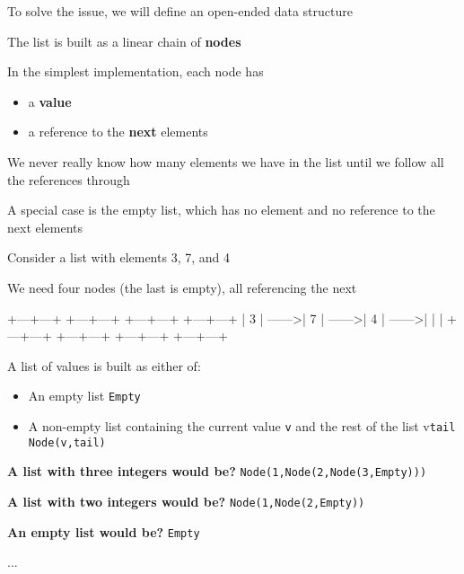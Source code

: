 \documentclass{beamer}
\begin{document}
\begin{slide}{
\item To solve the issue, we will define an open-ended data structure
\item The list is built as a linear chain of \textbf{nodes}
\item In the simplest implementation, each node has
\begin{itemize}
\item a \textbf{value}
\item a reference to the \textbf{next} elements
\end{itemize}
\item We never really know how many elements we have in the list until we follow all the references through
\item A special case is the empty list, which has no element and no reference to the next elements
}\end{slide}

\begin{frame}[fragile]
\begin{codewithblock}{\item Consider a list with elements 3, 7, and 4 \item We need four nodes (the last is empty), all referencing the next}
+---+---+    +---+---+    +---+---+    +---+---+
| 3 | ------>| 7 | ------>| 4 | ------>|   |   |
+---+---+    +---+---+    +---+---+    +---+---+
\end{codewithblock}
\end{frame}

\begin{slide}{
\item A list of values is built as either of:
\begin{itemize}
\item An empty list \texttt{Empty}
\item A non-empty list containing the current value \texttt{v} and the rest of the list v\texttt{tail} \texttt{Node(v,tail)}
\end{itemize}
\item \textbf{A list with three integers would be?} \pause \texttt{Node(1,Node(2,Node(3,Empty)))}
\item \textbf{A list with two integers would be?} \pause \texttt{Node(1,Node(2,Empty))}
\item \textbf{An empty list would be?} \pause \texttt{Empty}
\item ...
}\end{slide}
\end{document}
